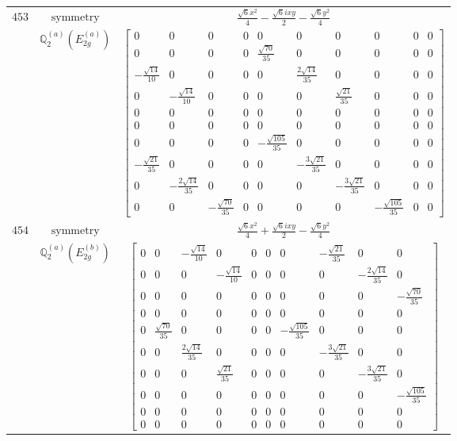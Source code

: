 \documentclass[fleqn,8pt,landscape]{jsarticle}
\begin{document}
\begin{longtable}{ccc}
$ 453 $ & $ \text{symmetry} $ & $ \frac{\sqrt{6} x^{2}}{4} - \frac{\sqrt{6} i x y}{2} - \frac{\sqrt{6} y^{2}}{4} $ \\
$  $ & $ \mathbb{Q}_{2}^{(a)}(E_{2g}^{(a)}) $ & $ \begin{bmatrix} 0 & 0 & 0 & 0 & 0 & 0 & 0 & 0 & 0 & 0 \\ 0 & 0 & 0 & 0 & \frac{\sqrt{70}}{35} & 0 & 0 & 0 & 0 & 0 \\ - \frac{\sqrt{14}}{10} & 0 & 0 & 0 & 0 & \frac{2 \sqrt{14}}{35} & 0 & 0 & 0 & 0 \\ 0 & - \frac{\sqrt{14}}{10} & 0 & 0 & 0 & 0 & \frac{\sqrt{21}}{35} & 0 & 0 & 0 \\ 0 & 0 & 0 & 0 & 0 & 0 & 0 & 0 & 0 & 0 \\ 0 & 0 & 0 & 0 & 0 & 0 & 0 & 0 & 0 & 0 \\ 0 & 0 & 0 & 0 & - \frac{\sqrt{105}}{35} & 0 & 0 & 0 & 0 & 0 \\ - \frac{\sqrt{21}}{35} & 0 & 0 & 0 & 0 & - \frac{3 \sqrt{21}}{35} & 0 & 0 & 0 & 0 \\ 0 & - \frac{2 \sqrt{14}}{35} & 0 & 0 & 0 & 0 & - \frac{3 \sqrt{21}}{35} & 0 & 0 & 0 \\ 0 & 0 & - \frac{\sqrt{70}}{35} & 0 & 0 & 0 & 0 & - \frac{\sqrt{105}}{35} & 0 & 0 \end{bmatrix} $ \\ \hline
$ 454 $ & $ \text{symmetry} $ & $ \frac{\sqrt{6} x^{2}}{4} + \frac{\sqrt{6} i x y}{2} - \frac{\sqrt{6} y^{2}}{4} $ \\
$  $ & $ \mathbb{Q}_{2}^{(a)}(E_{2g}^{(b)}) $ & $ \begin{bmatrix} 0 & 0 & - \frac{\sqrt{14}}{10} & 0 & 0 & 0 & 0 & - \frac{\sqrt{21}}{35} & 0 & 0 \\ 0 & 0 & 0 & - \frac{\sqrt{14}}{10} & 0 & 0 & 0 & 0 & - \frac{2 \sqrt{14}}{35} & 0 \\ 0 & 0 & 0 & 0 & 0 & 0 & 0 & 0 & 0 & - \frac{\sqrt{70}}{35} \\ 0 & 0 & 0 & 0 & 0 & 0 & 0 & 0 & 0 & 0 \\ 0 & \frac{\sqrt{70}}{35} & 0 & 0 & 0 & 0 & - \frac{\sqrt{105}}{35} & 0 & 0 & 0 \\ 0 & 0 & \frac{2 \sqrt{14}}{35} & 0 & 0 & 0 & 0 & - \frac{3 \sqrt{21}}{35} & 0 & 0 \\ 0 & 0 & 0 & \frac{\sqrt{21}}{35} & 0 & 0 & 0 & 0 & - \frac{3 \sqrt{21}}{35} & 0 \\ 0 & 0 & 0 & 0 & 0 & 0 & 0 & 0 & 0 & - \frac{\sqrt{105}}{35} \\ 0 & 0 & 0 & 0 & 0 & 0 & 0 & 0 & 0 & 0 \\ 0 & 0 & 0 & 0 & 0 & 0 & 0 & 0 & 0 & 0 \end{bmatrix} $ \\ \hline

\end{longtable}
\end{document}

